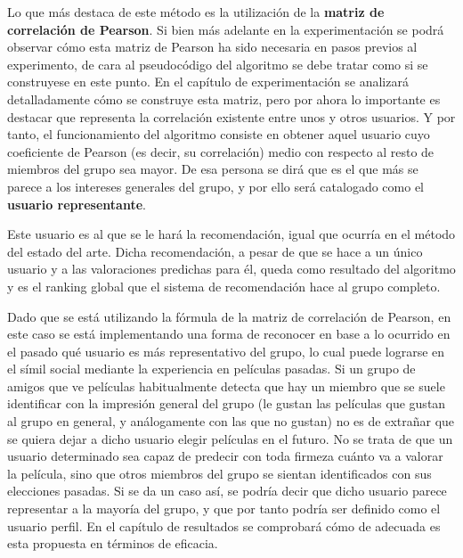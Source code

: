 Lo que más destaca de este método es la utilización de la \textbf{matriz de correlación de Pearson}. Si bien más adelante en la experimentación se podrá observar cómo esta matriz de Pearson ha sido necesaria en pasos previos al experimento, de cara al pseudocódigo del algoritmo se debe tratar como si se construyese en este punto. En el capítulo de experimentación se analizará detalladamente cómo se construye esta matriz, pero por ahora lo importante es destacar que representa la correlación existente entre unos y otros usuarios. Y por tanto, el funcionamiento del algoritmo consiste en obtener aquel usuario cuyo coeficiente de Pearson (es decir, su correlación) medio con respecto al resto de miembros del grupo sea mayor. De esa persona se dirá que es el que más se parece a los intereses generales del grupo, y por ello será catalogado como el \textbf{usuario representante}.

Este usuario es al que se le hará la recomendación, igual que ocurría en el método del estado del arte. Dicha recomendación, a pesar de que se hace a un único usuario y a las valoraciones predichas para él, queda como resultado del algoritmo y es el ranking global que el sistema de recomendación hace al grupo completo.

Dado que se está utilizando la fórmula de la matriz de correlación de Pearson, en este caso se está implementando una forma de reconocer en base a lo ocurrido en el pasado qué usuario es más representativo del grupo, lo cual puede lograrse en el símil social mediante la experiencia en películas pasadas. Si un grupo de amigos que ve películas habitualmente detecta que hay un miembro que se suele identificar con la impresión general del grupo (le gustan las películas que gustan al grupo en general, y análogamente con las que no gustan) no es de extrañar que se quiera dejar a dicho usuario elegir películas en el futuro. No se trata de que un usuario determinado sea capaz de predecir con toda firmeza cuánto va a valorar la película, sino que otros miembros del grupo se sientan identificados con sus elecciones pasadas. Si se da un caso así, se podría decir que dicho usuario parece representar a la mayoría del grupo, y que por tanto podría ser definido como el usuario perfil. En el capítulo de resultados se comprobará cómo de adecuada es esta propuesta en términos de eficacia.

